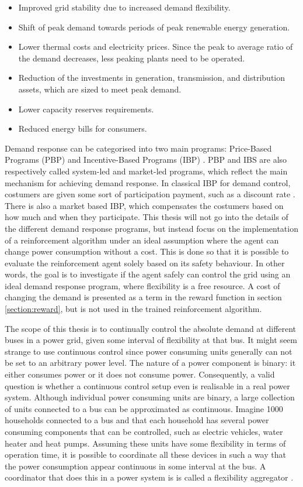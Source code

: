 \documentclass[class=book, crop=false, 11pt]{standalone}
\begin{document}
\begin{itemize}
\item Improved grid stability due to increased demand flexibility. 
\item Shift of peak demand towards periods of peak renewable energy
generation.
\item Lower thermal costs and electricity prices. Since the peak to average
ratio of the demand decreases, less peaking plants need to be operated. 
\item Reduction of the investments in generation, transmission, and distribution assets, which are sized to meet peak demand.
\item Lower capacity reserves requirements.
\item Reduced energy bills for consumers. 
\end{itemize}


Demand response can be categorised into two main programs: Price-Based Programs (PBP) and Incentive-Based Programs (IBP) \cite{demand_response_definition}. PBP and IBS are also respectively called system-led and market-led programs, which reflect the main mechanism for achieving demand response. In classical IBP for demand control, costumers are given some sort of participation payment, such as a discount rate \cite{demand_response_definition}. There is also a market based IBP, which compensates the costumers based on how much and when they participate. This thesis will not go into the details of the different demand response programs, but instead focus on the implementation of a reinforcement algorithm under an ideal assumption where the agent can change power consumption without a cost. This is done so that it is possible to evaluate the reinforcement agent solely based on its safety behaviour. In other words, the goal is to investigate if the agent safely can control the grid using an ideal demand response program, where flexibility is a free resource. A cost of changing the demand is presented as a term in the reward function in section \ref{section:reward}, but is not used in the trained reinforcement algorithm.    

The scope of this thesis is to continually control the absolute demand at different buses in a power grid, given some interval of flexibility at that bus. It might seem strange to use continuous control since power consuming units generally can not be set to an arbitrary power level. The nature of a power component is binary: it either consumes power or it does not consume power. Consequently, a valid question is whether a continuous control setup even is realisable in a real power system. Although individual power consuming units are binary, a large collection of units connected to a bus can be approximated as continuous. Imagine 1000 households connected to a bus and that each household has several power consuming components that can be controlled, such as electric vehicles, water heater and heat pumps. Assuming these units have some flexibility in terms of operation time, it is possible to coordinate all these devices in such a way that the power consumption appear continuous in some interval at the bus. A coordinator that does this in a power system is is called a flexibility aggregator \cite{koliou2014_aggregator}.
\end{document}
